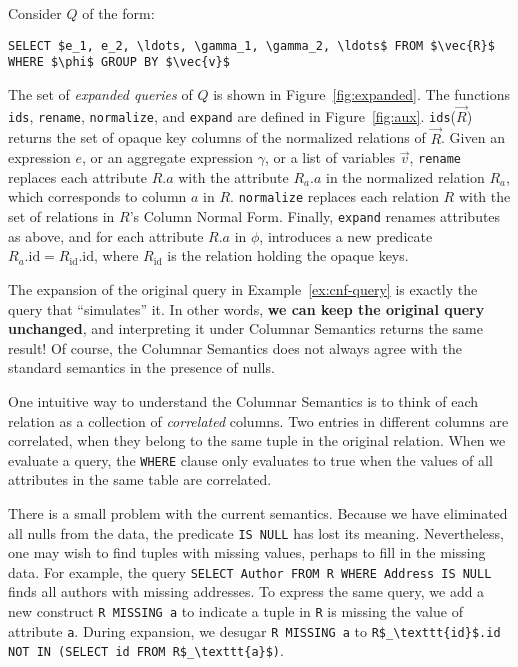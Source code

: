 \documentclass[sigconf,nonacm]{acmart}
\begin{document}
\begin{definition}
\label{def:cs}  
Consider $Q$ of the form:
%
\begin{lstlisting}
SELECT $e_1, e_2, \ldots, \gamma_1, \gamma_2, \ldots$ FROM $\vec{R}$ WHERE $\phi$ GROUP BY $\vec{v}$
\end{lstlisting}
%
The set of {\em expanded queries} of $Q$ is shown in Figure~\ref{fig:expanded}.
The functions \lstinline|ids|, 
 \lstinline|rename|, 
 \lstinline|normalize|, and \lstinline|expand| 
 are defined in Figure~\ref{fig:aux}.
\lstinline|ids|($\vec{R}$) returns the set of opaque key columns
 of the normalized relations of $\vec{R}$.
Given an expression $e$, or an aggregate expression $\gamma$,
 or a list of variables $\vec{v}$, 
 \lstinline|rename| replaces each attribute $R.a$ 
 with the attribute $R_a.a$ 
 in the normalized relation $R_a$, 
 which corresponds to column $a$ in $R$.
\lstinline|normalize| replaces each relation $R$ 
 with the set of relations in $R$'s Column Normal Form.
Finally, \lstinline|expand| renames attributes as above, 
 and for each attribute $R.a$ in $\phi$, 
 introduces a new predicate $R_a.\text{id} = R_\text{id}.\text{id}$,
 where $R_\text{id}$ is the relation holding the opaque keys.
\end{definition}

\begin{example}
\label{ex:cs}
The expansion of the original query in Example~\ref{ex:cnf-query} is
 exactly the query that ``simulates'' it.
In other words, \textbf{we can keep the original query unchanged},
 and interpreting it under Columnar Semantics
 returns the same result!
Of course, the Columnar Semantics does not 
 always agree with the standard semantics
 in the presence of nulls.
\end{example}

One intuitive way to understand the Columnar Semantics 
 is to think of each relation as a collection of {\em correlated} columns.
Two entries in different columns are correlated, 
 when they belong to the same tuple in the original relation.
When we evaluate a query, the \lstinline|WHERE| clause 
 only evaluates to true when the values of all attributes
 in the same table are correlated.

There is a small problem with the current semantics.
Because we have eliminated all nulls from the data, 
 the predicate \lstinline|IS NULL| has lost its meaning.
Nevertheless, one may wish to find tuples with missing values,
 perhaps to fill in the missing data.
For example, the query 
\lstinline|SELECT Author FROM R WHERE Address IS NULL|
finds all authors with missing addresses.
To express the same query, 
 we add a new construct \lstinline|R MISSING a|
 to indicate a tuple in \lstinline|R|
 is missing the value of attribute \lstinline|a|.
During expansion, we desugar \lstinline|R MISSING a|
 to \lstinline|R$_\texttt{id}$.id NOT IN (SELECT id FROM R$_\texttt{a}$)|.
\end{document}
